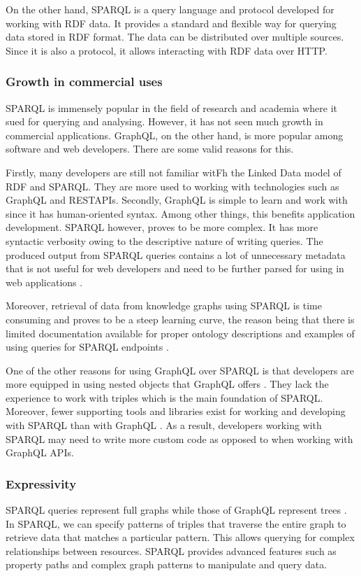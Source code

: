 On the other hand, SPARQL is a query language and protocol developed for working with RDF data. It provides a standard and flexible way for querying data stored in RDF format. The data can be distributed over multiple sources. Since it is also a protocol, it allows interacting with RDF data over HTTP. 
 
\subsubsection*{Growth in commercial uses}
SPARQL is immensely popular in the field of research and academia where it sued for querying and analysing. However, it has not seen much growth in commercial applications. GraphQL, on the other hand, is more popular among software and web developers. There are some valid reasons for this.  

Firstly, many developers are still not familiar witFh the Linked Data model of RDF and SPARQL. They are more used to working with technologies such as GraphQL and RESTAPIs. Secondly, GraphQL is simple to learn and work with since it has human-oriented syntax. Among other things, this benefits application development. SPARQL however, proves to be more complex. It has more syntactic verbosity owing to the descriptive nature of writing queries. The produced output from SPARQL queries contains a lot of unnecessary metadata that is not useful for web developers and need to be further parsed for using in web applications \cite{Lisena2018}. 

Moreover, retrieval of data from knowledge graphs using SPARQL is time consuming and proves to be a steep learning curve, the reason being that there is limited documentation available for proper ontology descriptions and examples of using queries for SPARQL endpoints \cite{Angele2022}.

One of the other reasons for using GraphQL over SPARQL is that developers are more equipped in using nested objects that GraphQL offers \cite{Taelman2018}. They lack the experience to work with triples which is the main foundation of SPARQL. Moreover, fewer supporting tools and libraries exist for working and developing with SPARQL than with GraphQL \cite{Taelman2018}. As a result, developers working with SPARQL may need to write more custom code as opposed to when working with GraphQL APIs.

\subsubsection*{Expressivity}
SPARQL queries represent full graphs while those of GraphQL represent trees \cite{Taelman2018}. In SPARQL, we can specify patterns of triples that traverse the entire graph to retrieve data that matches a particular pattern. This allows querying for complex relationships between resources. SPARQL provides advanced features such as property paths and complex graph patterns to manipulate and query data. 

